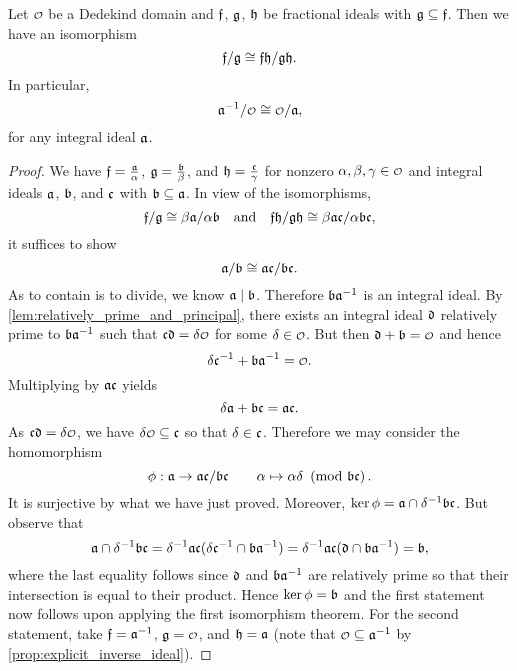     \begin{lemma}\label{lem:cancellation_isomorphism}
      Let $\smc{O}$ be a Dedekind domain and $\mathfrak{f}$, $\mathfrak{g}$, $\mathfrak{h}$ be fractional ideals with $\mathfrak{g} \subseteq \mathfrak{f}$. Then we have an isomorphism
      \[
        \mathfrak{f}/\mathfrak{g} \cong \mathfrak{f}\mathfrak{h}/\mathfrak{g}\mathfrak{h}.
      \]
      In particular,
      \[
        \mf{a}^{-1}/\smc{O} \cong \smc{O}/\mf{a},
      \]
      for any integral ideal $\mathfrak{a}$.
    \end{lemma}
    \begin{proof}
      We have $\mathfrak{f} = \frac{\mathfrak{a}}{\alpha}$, $\mathfrak{g} = \frac{\mathfrak{b}}{\beta}$, and $\mathfrak{h} = \frac{\mathfrak{c}}{\gamma}$ for nonzero $\a,\b,\g \in \smc{O}$ and integral ideals $\mathfrak{a}$, $\mathfrak{b}$, and $\mathfrak{c}$ with $\mathfrak{b} \subseteq \mathfrak{a}$. In view of the isomorphisms,
      \[
        \mathfrak{f}/\mathfrak{g} \cong \beta\mathfrak{a}/\alpha\mathfrak{b} \quad \text{and} \quad \mathfrak{f}\mathfrak{h}/\mathfrak{g}\mathfrak{h} \cong \beta\mathfrak{a}\mathfrak{c}/\alpha\mathfrak{b}\mathfrak{c},
      \]
      it suffices to show
      \[
        \mathfrak{a}/\mathfrak{b} \cong \mathfrak{a}\mathfrak{c}/\mathfrak{b}\mathfrak{c}.
      \]
      As to contain is to divide, we know $\mathfrak{a} \mid \mathfrak{b}$. Therefore $\mathfrak{b}\mathfrak{a}^{-1}$ is an integral ideal. By \cref{lem:relatively_prime_and_principal}, there exists an integral ideal $\mathfrak{d}$ relatively prime to $\mathfrak{b}\mathfrak{a}^{-1}$ such that $\mf{c}\mf{d} = \d\smc{O}$ for some $\d \in \smc{O}$. But then $\mf{d}+\mf{b} = \smc{O}$ and hence
      \[
        \d\mf{c}^{-1}+\mf{b}\mf{a}^{-1} = \smc{O}.
      \]
      Multiplying by $\mathfrak{a}\mathfrak{c}$ yields
      \[
        \delta\mathfrak{a}+\mathfrak{b}\mathfrak{c} = \mathfrak{a}\mathfrak{c}.
      \]
      As $\mf{c}\mf{d} = \d\smc{O}$, we have $\d\smc{O} \subseteq \mf{c}$ so that $\delta \in \mathfrak{c}$. Therefore we may consider the homomorphism
      \[
        \phi:\mathfrak{a} \to \mathfrak{a}\mathfrak{c}/\mathfrak{b}\mathfrak{c} \qquad \alpha \mapsto \alpha\delta \ \left(\text{mod }\mathfrak{b}\mathfrak{c}\right).
      \]
      It is surjective by what we have just proved. Moreover, $\ker\phi = \mathfrak{a} \cap \delta^{-1}\mathfrak{b}\mathfrak{c}$. But observe that
      \[
        \mathfrak{a} \cap \delta^{-1}\mathfrak{b}\mathfrak{c} = \delta^{-1}\mathfrak{a}\mathfrak{c}(\delta\mathfrak{c}^{-1} \cap \mathfrak{b}\mathfrak{a}^{-1}) = \delta^{-1}\mathfrak{a}\mathfrak{c}(\mathfrak{d} \cap \mathfrak{b}\mathfrak{a}^{-1}) = \mathfrak{b},
      \]
      where the last equality follows since $\mathfrak{d}$ and $\mathfrak{b}\mathfrak{a}^{-1}$ are relatively prime so that their intersection is equal to their product. Hence $\ker\phi = \mathfrak{b}$ and the first statement now follows upon applying the first isomorphism theorem. For the second statement, take $\mathfrak{f} = \mathfrak{a}^{-1}$, $\mf{g} = \smc{O}$, and $\mathfrak{h} = \mathfrak{a}$ (note that $\smc{O} \subseteq \mf{a}^{-1}$ by \cref{prop:explicit_inverse_ideal}).
    \end{proof}

